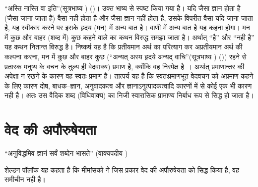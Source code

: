 “अस्ति नास्ति वा इति”(सूत्रभाष्य ) ()। उक्त भाष्य से स्पष्ट किया गया है। यदि जैसा ज्ञान होता है (जैसा जाना जाता है) वैसा नही होता है और जैसा ज्ञान नहीं होता है, उसके विपरीत वैसा यदि जाना जाता है, यह स्वीकार करने पर इसके हृदय (मन) में अन्य बात है। वाणी में अन्य बात है यह कहना होगा। मन में कुछ और बाहर (शब्द में) कुछ कहने वाले का कथन विरुद्ध समझा जाता है। अर्थात् “है” और “नही है” यह कथन नितान्त विरुद्ध है। निष्कर्ष यह है कि प्रतीयमान अर्थ का परित्याग कर अप्रतीयमान अर्थ की कल्पना करना, मन में कुछ और बाहर कुछ (“अन्यत् अस्य हृदये अन्यद् वाचि”(सूत्रभाष्य ) ()) रहने से प्रतारक मनुष्य के वचन के तुल्य ही वेदवाक्य) प्रमाण है, क्योंकि वह निरपेक्ष है~। अर्थात् प्रमाणान्तर की अपेक्षा न रखने के कारण वह स्वतः प्रमाण है। तात्पर्य यह है कि स्वतःप्रमाणभूत वेदवचन को अप्रमाण कहने के लिए कारण दोष, बाधक–ज्ञान, अनुवादकत्व और ज्ञानाऽनुत्पादकत्वादि कारणों में से कोई एक भी कारण नही है। अतः उस वैदिक शब्द (विधिवाक्य) का निजी स्वारासिक प्रामाण्य निर्बाध रूप से सिद्ध हो जाता है।


\section*{वेद की अपौरुषेयता}

“अनुविद्धमिव ज्ञानं सर्वं शब्देन भासते” (वाक्यपदीय )

शेल्डन पॉलॉक यह कहता है कि मीमांसको ने जिस प्रकार वेद की अपौरुषेयता को सिद्ध किया है, वह समीचीन नही है।

\begin{myquote}
\end{myquote}

\begin{myquote}
\end{myquote}

